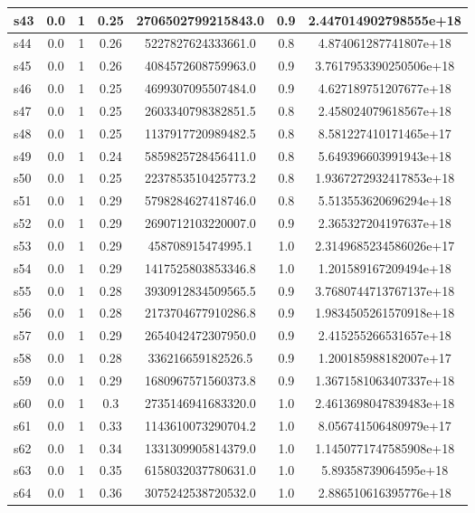 \documentclass{article}
\begin{document}
\begin{tabular}{|l|c|c|c|c|c|c|}
\hline
s43 &0.0 & 1 & 0.25 & 2706502799215843.0 & 0.9 & 2.447014902798555e+18\\
\hline
s44 &0.0 & 1 & 0.26 & 5227827624333661.0 & 0.8 & 4.874061287741807e+18\\
\hline
s45 &0.0 & 1 & 0.26 & 4084572608759963.0 & 0.9 & 3.7617953390250506e+18\\
\hline
s46 &0.0 & 1 & 0.25 & 4699307095507484.0 & 0.9 & 4.627189751207677e+18\\
\hline
s47 &0.0 & 1 & 0.25 & 2603340798382851.5 & 0.8 & 2.458024079618567e+18\\
\hline
s48 &0.0 & 1 & 0.25 & 1137917720989482.5 & 0.8 & 8.581227410171465e+17\\
\hline
s49 &0.0 & 1 & 0.24 & 5859825728456411.0 & 0.8 & 5.649396603991943e+18\\
\hline
s50 &0.0 & 1 & 0.25 & 2237853510425773.2 & 0.8 & 1.9367272932417853e+18\\
\hline
s51 &0.0 & 1 & 0.29 & 5798284627418746.0 & 0.8 & 5.513553620696294e+18\\
\hline
s52 &0.0 & 1 & 0.29 & 2690712103220007.0 & 0.9 & 2.365327204197637e+18\\
\hline
s53 &0.0 & 1 & 0.29 & 458708915474995.1 & 1.0 & 2.3149685234586026e+17\\
\hline
s54 &0.0 & 1 & 0.29 & 1417525803853346.8 & 1.0 & 1.201589167209494e+18\\
\hline
s55 &0.0 & 1 & 0.28 & 3930912834509565.5 & 0.9 & 3.7680744713767137e+18\\
\hline
s56 &0.0 & 1 & 0.28 & 2173704677910286.8 & 0.9 & 1.9834505261570918e+18\\
\hline
s57 &0.0 & 1 & 0.29 & 2654042472307950.0 & 0.9 & 2.415255266531657e+18\\
\hline
s58 &0.0 & 1 & 0.28 & 336216659182526.5 & 0.9 & 1.200185988182007e+17\\
\hline
s59 &0.0 & 1 & 0.29 & 1680967571560373.8 & 0.9 & 1.3671581063407337e+18\\
\hline
s60 &0.0 & 1 & 0.3 & 2735146941683320.0 & 1.0 & 2.4613698047839483e+18\\
\hline
s61 &0.0 & 1 & 0.33 & 1143610073290704.2 & 1.0 & 8.056741506480979e+17\\
\hline
s62 &0.0 & 1 & 0.34 & 1331309905814379.0 & 1.0 & 1.1450771747585908e+18\\
\hline
s63 &0.0 & 1 & 0.35 & 6158032037780631.0 & 1.0 & 5.89358739064595e+18\\
\hline
s64 &0.0 & 1 & 0.36 & 3075242538720532.0 & 1.0 & 2.886510616395776e+18\\

\end{tabular}
\end{document}
